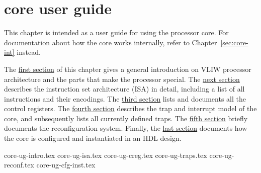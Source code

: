 \chapter{\rvex{} core user guide}
\label{sec:core-ug}

This chapter is intended as a user guide for using the \rvex{} processor core.
For documentation about how the core works internally, refer to
Chapter~\ref{sec:core-int} instead.

The \hyperref[sec:core-ug-intro]{first section} of this chapter gives a general 
introduction on VLIW processor architecture and the parts that make the \rvex{} 
processor special. The \hyperref[sec:core-ug-isa]{next section} describes the 
instruction set architecture (ISA) in detail, including a list of all 
instructions and their encodings. The \hyperref[sec:core-ug-creg]{third section} 
lists and documents all the control registers. The 
\hyperref[sec:core-ug-traps]{fourth section} describes the trap and interrupt 
model of the core, and subsequently lists all currently defined traps. The 
\hyperref[sec:core-ug-reconf]{fifth section} briefly documents the 
reconfiguration system. Finally, the \hyperref[sec:core-ug-cfg-inst]{last 
section} documents how the core is configured and instantiated in an HDL design.

{core-ug-intro.tex}
{core-ug-isa.tex}
{core-ug-creg.tex}
{core-ug-traps.tex}
{core-ug-reconf.tex}
{core-ug-cfg-inst.tex}
